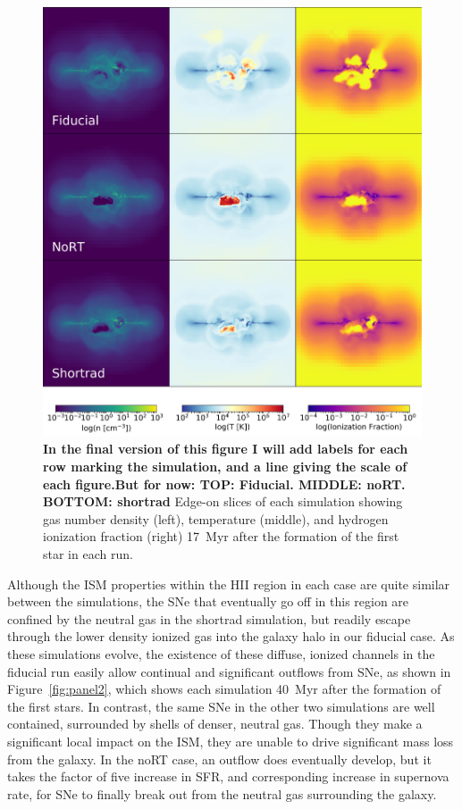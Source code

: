 \documentclass[twocolumn]{aastex62}
\begin{document}
\begin{figure}
\centering
\includegraphics[width=0.99\linewidth]{DD0136_fiducial_shortrad_nort}
\caption{\textbf{In the final version of this figure I will add labels for each row marking the simulation, and a line giving the scale of each figure.But for now: TOP: Fiducial. MIDDLE: noRT. BOTTOM: shortrad} Edge-on slices of each simulation showing gas number density (left), temperature (middle), and hydrogen ionization fraction (right) 17~Myr after the formation of the first star in each run.}
\label{fig:panel1}
\end{figure}

Although the ISM properties within the HII region in each case are quite similar between the simulations, the SNe that eventually go off in this region are confined by the neutral gas in the shortrad simulation, but 
   readily escape through the lower density ionized gas
into the galaxy halo in our fiducial case. As these simulations evolve, the existence of these diffuse, ionized channels in the fiducial run easily allow continual and significant outflows from SNe,
   as shown in  Figure~\ref{fig:panel2}, which shows each simulation 40~Myr after the 
   formation of the first stars. 
In contrast, the same SNe in the other two simulations are well contained, surrounded by shells of denser, neutral gas. Though they make a significant local impact on the ISM, they are unable to drive significant mass loss from the galaxy. In the noRT case, an outflow does eventually develop, but it takes the factor of five increase in SFR, and corresponding increase in supernova rate, for SNe to finally break out from the neutral gas surrounding the galaxy. 
\end{document}
